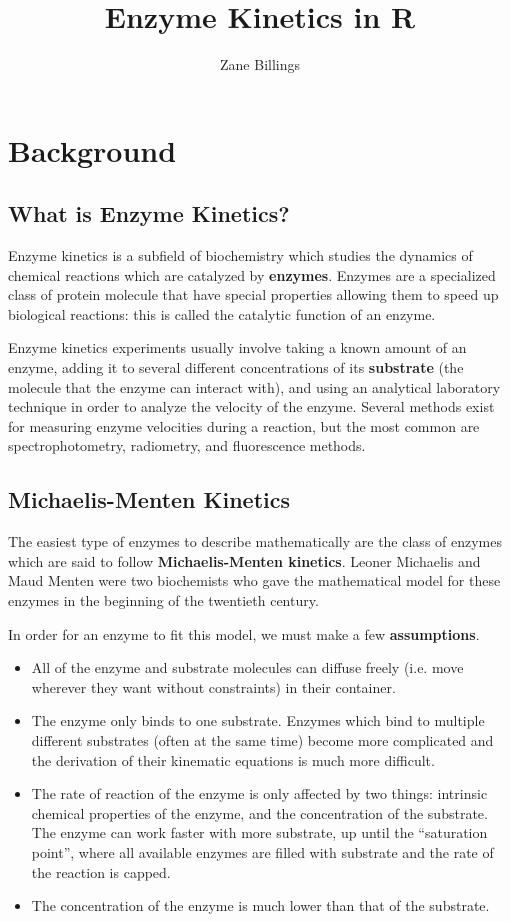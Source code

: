 \documentclass[11pt]{article}
\title{Enzyme Kinetics in R}
\author{Zane Billings}
\date{}
\begin{document}
\maketitle

\section*{Background}
\subsection*{What is Enzyme Kinetics?}
Enzyme kinetics is a subfield of biochemistry which studies the dynamics of chemical reactions which are catalyzed by {\bf enzymes}. Enzymes are a specialized class of protein molecule that have special properties allowing them to speed up biological reactions: this is called the catalytic function of an enzyme.

Enzyme kinetics experiments usually involve taking a known amount of an enzyme, adding it to several different concentrations of its {\bf substrate} (the molecule that the enzyme can interact with), and using an analytical laboratory technique in order to analyze the velocity of the enzyme. Several methods exist for measuring enzyme velocities during a reaction, but the most common are spectrophotometry, radiometry, and fluorescence methods.

\subsection*{Michaelis-Menten Kinetics}
The easiest type of enzymes to describe mathematically are the class of enzymes which are said to follow {\bf Michaelis-Menten kinetics}. Leoner Michaelis and Maud Menten were two biochemists who gave the mathematical model for these enzymes in the beginning of the twentieth century.

In order for an enzyme to fit this model, we must make a few {\bf assumptions}.
\begin{itemize}
	\item All of the enzyme and substrate molecules can diffuse freely (i.e. move wherever they want without constraints) in their container.
	\item The enzyme only binds to one substrate. Enzymes which bind to multiple different substrates (often at the same time) become more complicated and the derivation of their kinematic equations is much more difficult.
	\item The rate of reaction of the enzyme is only affected by two things: intrinsic chemical properties of the enzyme, and the concentration of the substrate. The enzyme can work faster with more substrate, up until the ``saturation point'', where all available enzymes are filled with substrate and the rate of the reaction is capped.
	\item The concentration of the enzyme is much lower than that of the substrate.
\end{itemize}
\end{document}
